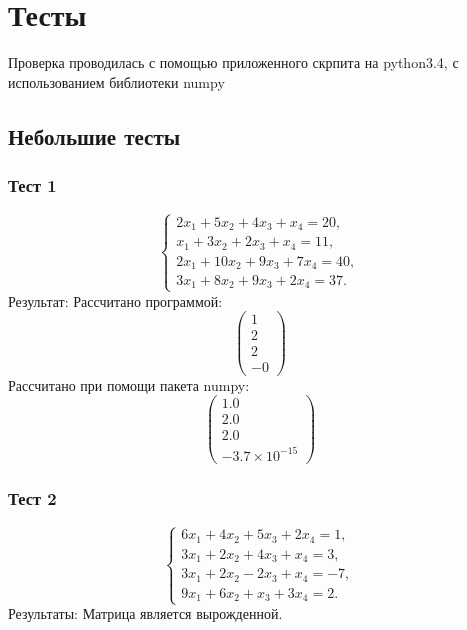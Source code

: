\newpage
\section{Тесты}
Проверка проводилась с помощью приложенного скрпита на python3.4, с использованием библиотеки numpy
\subsection{Небольшие тесты}
\subsubsection{Тест 1}
\begin{equation*}
    \begin{cases}
    2x_1 + 5x_2 + 4x_3 + x_4 = 20, \\
    x_1 + 3x_2 + 2x_3 + x_4 = 11, \\
    2x_1 + 10x_2 + 9x_3 + 7x_4 = 40, \\
    3x_1 + 8x_2 + 9x_3 + 2x_4 = 37.
    \end{cases}
\end{equation*}
Результат:
Рассчитано программой:
\begin{equation*}
    \begin{pmatrix}
        1 \\
        2 \\
        2 \\
        -0
    \end{pmatrix}
\end{equation*}
Рассчитано при помощи пакета numpy:
\begin{equation*}
    \begin{pmatrix}
        1.0 \\
        2.0 \\
        2.0 \\
        -3.7 \times 10^{-15}
    \end{pmatrix}
\end{equation*}

\subsubsection{Тест 2}
\begin{equation*}
    \begin{cases}
    6x_1 + 4x_2 + 5x_3 + 2x_4 = 1, \\
    3x_1 + 2x_2 + 4x_3 + x_4 = 3, \\
    3x_1 + 2x_2 - 2x_3 + x_4 = -7, \\
    9x_1 + 6x_2 + x_3 + 3x_4 = 2.
    \end{cases}
\end{equation*}
Результаты:
Матрица является вырожденной.

